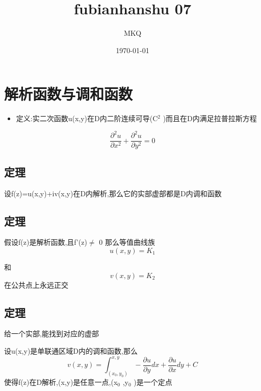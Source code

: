\documentclass[11pt]{article}
\author{MKQ}
\date{\today}
\title{fubianhanshu 07}
\begin{document}
\maketitle
\tableofcontents

\section{解析函数与调和函数}
\label{sec:org5a13847}
\begin{itemize}
\item 定义:实二次函数u(x,y)在D内二阶连续可导(C\(^{\text{2}}\) )而且在D内满足拉普拉斯方程
\end{itemize}
\[
\frac{\partial^2 u }{\partial x^2}+\frac{\partial^2 u}{\partial y^2}=0
\]
\subsection{定理}
\label{sec:org3331ca0}
设f(z)=u(x,y)+iv(x,y)在D内解析,那么它的实部虚部都是D内调和函数
\subsection{定理}
\label{sec:org948d9c6}
假设f(z)是解析函数,且f'(z)\(\neq\) 0
那么等值曲线族
\[
u(x,y)=K_1
\]


和
\[
v(x,y)=K_2
\]
在公共点上永远正交
\subsection{定理}
\label{sec:orgfb8df35}
给一个实部,能找到对应的虚部

设u(x,y)是单联通区域D内的调和函数,那么
\[
v(x,y)=\int_{(x_0,y_0)}^{x,y} -\frac{\partial u}{\partial y}dx+ \frac{\partial u}{\partial x}dy+C
\]
使得f(z)在D解析,(x,y)是任意一点,(x\(_{\text{0}}\) ,y\(_{\text{0}}\) )是一个定点
\end{document}
